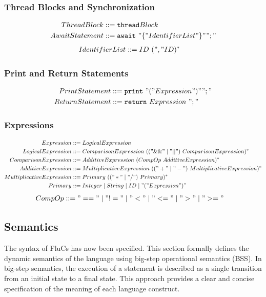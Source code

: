 \subsubsection{Thread Blocks and Synchronization}
\begin{align*}
ThreadBlock &::= \texttt{thread} Block \\
AwaitStatement &::= \texttt{await}\ "\{" IdentifierList "\}" ";"
\end{align*}
\begin{align*}
IdentifierList &::= ID\ ("," ID)^*
\end{align*}
\subsubsection{Print and Return Statements}
\begin{align*}
PrintStatement &::= \texttt{print}\ "(" Expression ")" ";" \\
ReturnStatement &::= \texttt{return}\ Expression\ ";"
\end{align*}
\subsubsection{Expressions}
\begin{align*}
Expression &::= LogicalExpression \\
LogicalExpression &::= ComparisonExpression\ (("\&\&" \mid "||")\ ComparisonExpression)^* \\
ComparisonExpression &::= AdditiveExpression\ (CompOp\ AdditiveExpression)^* \\
AdditiveExpression &::= MultiplicativeExpression\ (("+" \mid "-")\ MultiplicativeExpression)^* \\
MultiplicativeExpression &::= Primary\ (("*" \mid "/")\ Primary)^* \\
Primary &::= Integer \mid String \mid ID \mid "(" Expression ")"
\end{align*}
\begin{align*}
CompOp &::= "==" \mid "!=" \mid "<" \mid "<=" \mid ">" \mid ">="
\end{align*}
\subsection{Semantics}
The syntax of FluCs has now been specified. This section formally defines the dynamic semantics of the language using big-step operational semantics (BSS). In big-step semantics, the execution of a statement is described as a single transition from an initial state to a final state. This approach provides a clear and concise specification of the meaning of each language construct.

